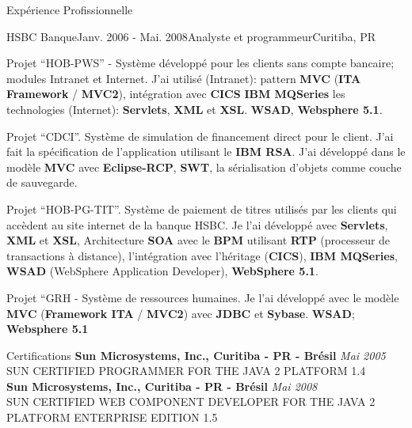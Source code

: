 \documentclass{resume}
\begin{document}
\begin{rSection}{Expérience Profissionnelle}
\begin{rSubsection}{HSBC Banque}{Janv. 2006 - Mai. 2008}{Analyste et programmeur}{Curitiba, PR}
    \item Projet “HOB-PWS” - Système développé pour les clients sans compte bancaire; modules Intranet et Internet. J’ai utilisé (Intranet): pattern \textbf{MVC} (\textbf{ITA Framework} / \textbf{MVC2}), intégration avec \textbf{CICS} \textbf{IBM MQSeries} les technologies (Internet): \textbf{Servlets}, \textbf{XML} et \textbf{XSL}. \textbf{WSAD}, \textbf{Websphere 5.1}.\\
    \item Projet “CDCI”. Système de simulation de financement direct pour le client. J’ai fait la spécification de l’application utilisant le \textbf{IBM RSA}. J’ai développé dans le modèle \textbf{MVC} avec \textbf{Eclipse-RCP}, \textbf{SWT}, la sérialisation d'objets comme couche de sauvegarde.\\
    \item Projet “HOB-PG-TIT”. Système de paiement de titres utilisés par les clients qui accèdent au site internet de la banque HSBC. Je l’ai développé avec \textbf{Servlets}, \textbf{XML} et \textbf{XSL}, Architecture \textbf{SOA} avec le \textbf{BPM} utilisant \textbf{RTP} (processeur de transactions à distance), l'intégration avec l'héritage (\textbf{CICS}), \textbf{IBM MQSeries}, \textbf{WSAD} (WebSphere Application Developer), \textbf{WebSphere 5.1}.\\
    \item Projet “GRH - Système de ressources humaines. Je l’ai développé avec le modèle \textbf{MVC} (\textbf{Framework ITA} / \textbf{MVC2}) avec \textbf{JDBC} et \textbf{Sybase}. \textbf{WSAD}; \textbf{Websphere 5.1}
    \end{rSubsection}
  \end{rSection}

  \begin{rSection}{Certifications}
    {\bf Sun Microsystems, Inc., Curitiba - PR - Brésil} \hfill {\em Mai 2005} \\ 
    {SUN CERTIFIED PROGRAMMER FOR THE JAVA 2 PLATFORM 1.4} \\

    {\bf Sun Microsystems, Inc., Curitiba - PR - Brésil} \hfill {\em Mai 2008} \\ 
    {SUN CERTIFIED WEB COMPONENT DEVELOPER FOR THE JAVA 2 PLATFORM ENTERPRISE EDITION 1.5} \\
  \end{rSection}
  
\end{document}
